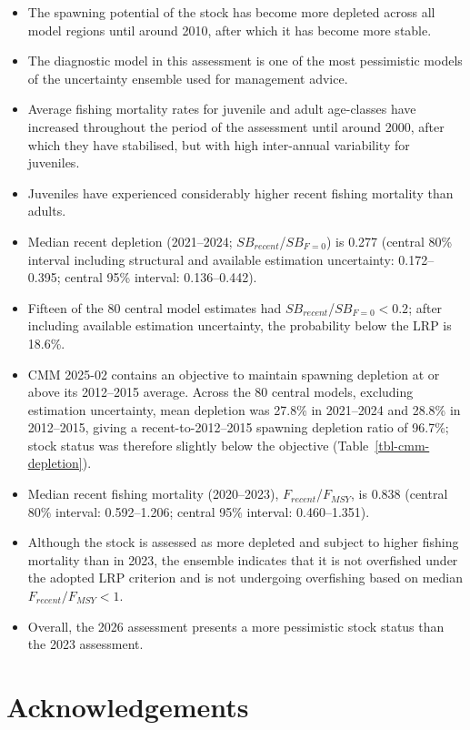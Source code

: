 \documentclass[
  english,
  a4paper,
  a4paper,
  11pt]{SCreport}
\begin{document}
\begin{itemize}
\item
  The spawning potential of the stock has become more depleted across
  all model regions until around 2010, after which it has become more
  stable.
\item
  The diagnostic model in this assessment is one of the most pessimistic
  models of the uncertainty ensemble used for management advice.
\item
  Average fishing mortality rates for juvenile and adult age-classes
  have increased throughout the period of the assessment until around
  2000, after which they have stabilised, but with high inter-annual
  variability for juveniles.
\item
  Juveniles have experienced considerably higher recent fishing
  mortality than adults.
\item
  Median recent depletion (2021--2024; \(SB_{recent}\)/\(SB_{F=0}\)) is
  0.277 (central 80\% interval including structural and available
  estimation uncertainty: 0.172--0.395; central 95\% interval:
  0.136--0.442).
\item
  Fifteen of the 80 central model estimates had
  \(SB_{recent}\)/\(SB_{F=0}<0.2\); after including available estimation
  uncertainty, the probability below the LRP is 18.6\%.
\item
  CMM 2025-02 contains an objective to maintain spawning depletion at or
  above its 2012--2015 average. Across the 80 central models, excluding
  estimation uncertainty, mean depletion was 27.8\% in 2021--2024 and
  28.8\% in 2012--2015, giving a recent-to-2012--2015 spawning depletion
  ratio of 96.7\%; stock status was therefore slightly below the
  objective (Table~\ref{tbl-cmm-depletion}).
\item
  Median recent fishing mortality (2020--2023),
  \(F_{recent}\)/\(F_{MSY}\), is 0.838 (central 80\% interval:
  0.592--1.206; central 95\% interval: 0.460--1.351).
\item
  Although the stock is assessed as more depleted and subject to higher
  fishing mortality than in 2023, the ensemble indicates that it is not
  overfished under the adopted LRP criterion and is not undergoing
  overfishing based on median \(F_{recent}/F_{MSY}<1\).
\item
  Overall, the 2026 assessment presents a more pessimistic stock status
  than the 2023 assessment.
\end{itemize}

\section{Acknowledgements}\label{acknowledgements}
\end{document}
